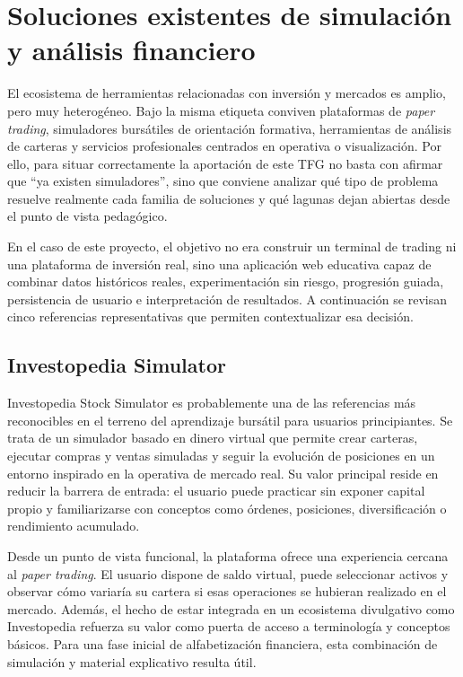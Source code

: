 \section{Soluciones existentes de simulación y análisis financiero}

El ecosistema de herramientas relacionadas con inversión y mercados es amplio, pero muy heterogéneo. Bajo la misma etiqueta conviven plataformas de \textit{paper trading}, simuladores bursátiles de orientación formativa, herramientas de análisis de carteras y servicios profesionales centrados en operativa o visualización. Por ello, para situar correctamente la aportación de este TFG no basta con afirmar que “ya existen simuladores”, sino que conviene analizar qué tipo de problema resuelve realmente cada familia de soluciones y qué lagunas dejan abiertas desde el punto de vista pedagógico.

En el caso de este proyecto, el objetivo no era construir un terminal de trading ni una plataforma de inversión real, sino una aplicación web educativa capaz de combinar datos históricos reales, experimentación sin riesgo, progresión guiada, persistencia de usuario e interpretación de resultados. A continuación se revisan cinco referencias representativas que permiten contextualizar esa decisión.

\subsection{Investopedia Simulator}

Investopedia Stock Simulator \cite{investopedia} es probablemente una de las referencias más reconocibles en el terreno del aprendizaje bursátil para usuarios principiantes. Se trata de un simulador basado en dinero virtual que permite crear carteras, ejecutar compras y ventas simuladas y seguir la evolución de posiciones en un entorno inspirado en la operativa de mercado real. Su valor principal reside en reducir la barrera de entrada: el usuario puede practicar sin exponer capital propio y familiarizarse con conceptos como órdenes, posiciones, diversificación o rendimiento acumulado.

Desde un punto de vista funcional, la plataforma ofrece una experiencia cercana al \textit{paper trading}. El usuario dispone de saldo virtual, puede seleccionar activos y observar cómo variaría su cartera si esas operaciones se hubieran realizado en el mercado. Además, el hecho de estar integrada en un ecosistema divulgativo como Investopedia refuerza su valor como puerta de acceso a terminología y conceptos básicos. Para una fase inicial de alfabetización financiera, esta combinación de simulación y material explicativo resulta útil.

